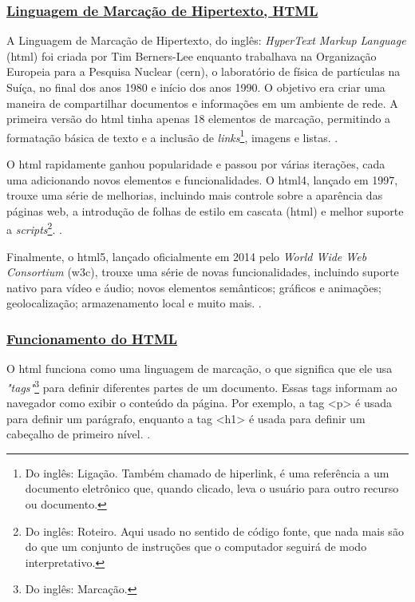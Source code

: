 \subsubsection{\underline{Linguagem de Marcação de Hipertexto, HTML}}

A Linguagem de Marcação de Hipertexto, do inglês: \textit{HyperText Markup Language}
(\acrshort{html})
foi criada por Tim Berners-Lee enquanto trabalhava na Organização Europeia para a
Pesquisa Nuclear
(\acrshort{cern}),
o laboratório de física de partículas na Suíça, no final dos anos
1980 e início dos anos 1990. O objetivo era criar uma maneira de compartilhar documentos e
informações em um ambiente de rede. A primeira versão do
\acrshort{html}
tinha apenas 18 elementos
de marcação, permitindo a formatação básica de texto e a inclusão de
\textit{links}\footnote{Do inglês: Ligação. Também chamado de hiperlink, é uma referência a um
    documento eletrônico que, quando clicado, leva o usuário para outro recurso
    ou documento.
},
imagens e listas.
\cite{w3c}.

O
\acrshort{html}
rapidamente ganhou popularidade e passou por várias iterações, cada uma
adicionando novos elementos e funcionalidades. O
\acrshort{html}4,
lançado em 1997, trouxe uma
série de melhorias, incluindo mais controle sobre a aparência das páginas web, a introdução
de folhas de estilo em cascata
(\acrshort{html})
e melhor suporte a
\textit{scripts}\footnote{Do inglês: Roteiro. Aqui usado no sentido de código fonte, que nada mais são
    do que um conjunto de instruções que o computador seguirá de modo interpretativo.
}.
\cite{w3c}.

Finalmente, o
\acrshort{html}5,
lançado oficialmente em 2014 pelo
\textit{World Wide Web Consortium}
(\acrshort{w3c}), trouxe uma série de novas funcionalidades, incluindo suporte nativo para
vídeo e áudio; novos elementos semânticos; gráficos e animações; geolocalização;
armazenamento local e muito mais.
\cite{w3c}.

\subsubsection{\underline{Funcionamento do HTML}}

O
\acrshort{html}
funciona como uma linguagem de marcação, o que significa que ele usa
\textit{"tags"}\footnote{Do inglês: Marcação.
}
para definir diferentes partes de um documento. Essas tags informam ao navegador
como exibir o conteúdo da página. Por exemplo, a tag
<p>
é usada para definir um parágrafo,
enquanto a tag
<h1>
é usada para definir um cabeçalho de primeiro nível.
\cite{w3c}.

